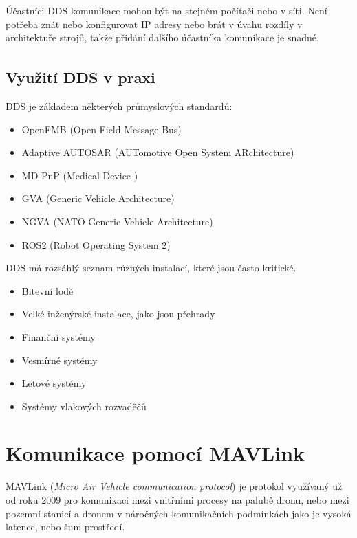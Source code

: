 Účastníci \acs{DDS} komunikace mohou být na stejném počítači nebo v síti. Není potřeba znát nebo konfigurovat IP adresy nebo brát v úvahu rozdíly v architektuře strojů, takže přidání dalšího účastníka komunikace je snadné.

\subsection{Využití DDS\texorpdfstring{\textsuperscript{\textregistered}}{ (R)} v praxi}

\acl{DDS} je základem některých průmyslových standardů: \cite{DDS_usage}

\begin{itemize}
    \item OpenFMB (Open Field Message Bus)
    \item Adaptive AUTOSAR (AUTomotive Open System ARchitecture)
    \item MD PnP (Medical Device )
    \item GVA (Generic Vehicle Architecture)
    \item NGVA (NATO Generic Vehicle Architecture)
    \item ROS2 (Robot Operating System 2) \\[0.2cm]
\end{itemize}

\acs{DDS} má rozsáhlý seznam různých instalací, které jsou často kritické. \cite{ROS2DDS}

\begin{itemize}
    \item Bitevní lodě
    \item Velké inženýrské instalace, jako jsou přehrady
    \item Finanční systémy
    \item Vesmírné systémy
    \item Letové systémy
    \item Systémy vlakových rozvaděčů
\end{itemize}

\section{Komunikace pomocí MAVLink}

MAVLink (\textit{Micro Air Vehicle communication protocol}) je  protokol využívaný už od roku 2009 pro komunikaci mezi vnitřními procesy na palubě dronu, nebo mezi pozemní stanicí a dronem v náročných komunikačních podmínkách jako je vysoká latence, nebo šum prostředí.

